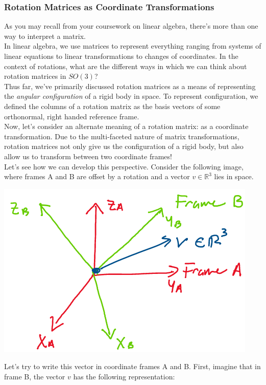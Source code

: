 \documentclass[oneside]{book}
\begin{document}
\subsubsection{Rotation Matrices as Coordinate Transformations}
As you may recall from your coursework on linear algebra, there's more than one way to interpret a matrix.\\
In linear algebra, we use matrices to represent everything ranging from systems of linear equations to linear transformations to changes of coordinates. In the context of rotations, what are the different ways in which we can think about rotation matrices in $SO(3)$?\\
Thus far, we've primarily discussed rotation matrices as a means of representing the \textit{angular configuration} of a rigid body in space. To represent configuration, we defined the columns of a rotation matrix as the basis vectors of some orthonormal, right handed reference frame.\\
Now, let's consider an alternate meaning of a rotation matrix: as a coordinate transformation. Due to the multi-faceted nature of matrix transformations, rotation matrices not only give us the configuration of a rigid body, but also allow us to transform between two coordinate frames!\\
Let's see how we can develop this perspective. Consider the following image, where frames A and B are offset by a rotation and a vector $v \in \mathbb{R}^3$ lies in space.
\begin{center}
    \includegraphics[scale=0.5]{images/transform.png}
\end{center}
Let's try to write this vector in coordinate frames A and B. First, imagine that in frame B, the vector $v$ has the following representation:
\end{document}
